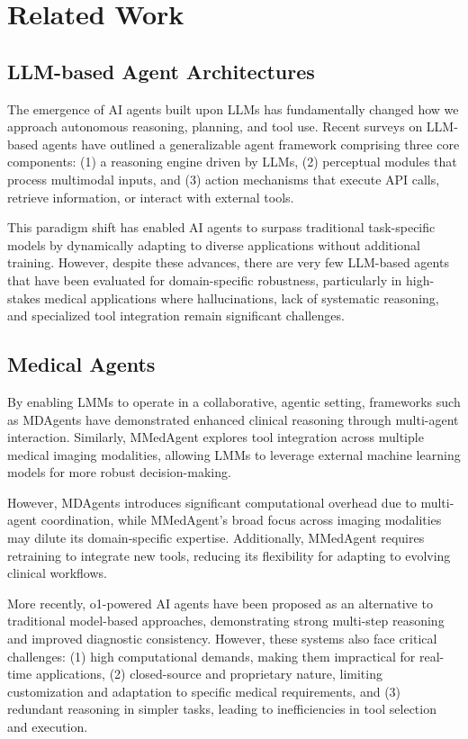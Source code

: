 \section{Related Work}
\subsection{LLM-based Agent Architectures}
The emergence of AI agents built upon LLMs has fundamentally changed how we approach autonomous reasoning, planning, and tool use. Recent surveys on LLM-based agents \cite{xi2025rise, zhao2023depth, masterman2024landscape} have outlined a generalizable agent framework comprising three core components: (1) a reasoning engine driven by LLMs, (2) perceptual modules that process multimodal inputs, and (3) action mechanisms that execute API calls, retrieve information, or interact with external tools.

This paradigm shift has enabled AI agents to surpass traditional task-specific models by dynamically adapting to diverse applications without additional training. However, despite these advances, there are very few LLM-based agents that have been evaluated for domain-specific robustness, particularly in high-stakes medical applications where hallucinations, lack of systematic reasoning, and specialized tool integration remain significant challenges.

\subsection{Medical Agents}
By enabling LMMs to operate in a collaborative, agentic setting, frameworks such as MDAgents \cite{kim2024mdagents} have demonstrated enhanced clinical reasoning through multi-agent interaction. Similarly, MMedAgent \cite{li2024mmedagent} explores tool integration across multiple medical imaging modalities, allowing LMMs to leverage external machine learning models for more robust decision-making.

However, MDAgents introduces significant computational overhead due to multi-agent coordination, while MMedAgent’s broad focus across imaging modalities may dilute its domain-specific expertise. Additionally, MMedAgent requires retraining to integrate new tools, reducing its flexibility for adapting to evolving clinical workflows.

More recently, o1-powered AI agents \cite{jaech2024openai} have been proposed as an alternative to traditional model-based approaches, demonstrating strong multi-step reasoning and improved diagnostic consistency. However, these systems also face critical challenges: (1) high computational demands, making them impractical for real-time applications, (2) closed-source and proprietary nature, limiting customization and adaptation to specific medical requirements, and (3) redundant reasoning in simpler tasks, leading to inefficiencies in tool selection and execution.

